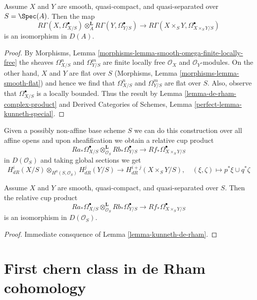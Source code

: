 \begin{lemma}
\label{lemma-kunneth-de-rham}
Assume $X$ and $Y$ are smooth, quasi-compact, and quasi-separated over
$S = \Spec(A)$. Then the map
$$
R\Gamma(X, \Omega^\bullet_{X/S})
\otimes_A^\mathbf{L}
R\Gamma(Y, \Omega^\bullet_{Y/S})
\longrightarrow
R\Gamma(X \times_S Y, \Omega^\bullet_{X \times_S Y/S})
$$
is an isomorphism in $D(A)$.
\end{lemma}

\begin{proof}
By Morphisms, Lemma \ref{morphisms-lemma-smooth-omega-finite-locally-free}
the sheaves $\Omega^n_{X/S}$ and $\Omega^m_{Y/S}$ are finite locally free
$\mathcal{O}_X$ and $\mathcal{O}_Y$-modules. On the other hand, $X$ and $Y$
are flat over $S$ (Morphisms, Lemma \ref{morphisms-lemma-smooth-flat})
and hence we find that $\Omega^n_{X/S}$ and $\Omega^m_{Y/S}$ are flat over $S$.
Also, observe that $\Omega^\bullet_{X/S}$ is a locally bounded. Thus
the result by Lemma \ref{lemma-de-rham-complex-product} and
Derived Categories of Schemes, Lemma \ref{perfect-lemma-kunneth-special}.
\end{proof}

\noindent
Given a possibly non-affine base scheme $S$ we can do this
construction over all affine opens and upon sheafification
we obtain a relative cup product
$$
Ra_*\Omega^\bullet_{X/S}
\otimes_{\mathcal{O}_S}^\mathbf{L}
Rb_*\Omega^\bullet_{Y/S}
\longrightarrow
Rf_*\Omega^\bullet_{X \times_S Y/S}
$$
in $D(\mathcal{O}_S)$ and taking global sections we get
$$
H^i_{dR}(X/S) \otimes_{H^0(S, \mathcal{O}_S)} H^j_{dR}(Y/S)
\longrightarrow
H^{i + j}_{dR}(X \times_S Y/S),\quad
(\xi, \zeta) \longmapsto p^*\xi \cup q^*\zeta
$$

\begin{lemma}
\label{lemma-kunneth-de-rham-relative}
Assume $X$ and $Y$ are smooth, quasi-compact, and quasi-separated over
$S$. Then the relative cup product
$$
Ra_*\Omega^\bullet_{X/S}
\otimes_{\mathcal{O}_S}^\mathbf{L}
Rb_*\Omega^\bullet_{Y/S}
\longrightarrow
Rf_*\Omega^\bullet_{X \times_S Y/S}
$$
is an isomorphism in $D(\mathcal{O}_S)$.
\end{lemma}

\begin{proof}
Immediate consquence of Lemma \ref{lemma-kunneth-de-rham}.
\end{proof}







\section{First chern class in de Rham cohomology}
\label{section-first-chern-class}

